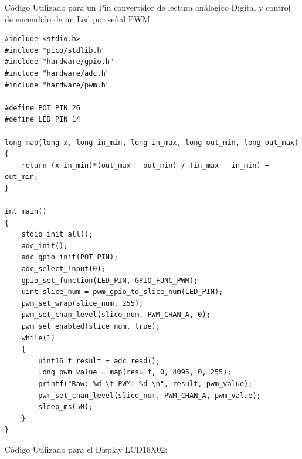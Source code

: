 \documentclass[12pt]{book} %
\begin{document}
Código Utilizado para un Pin convertidor de lectura análogico Digital y control de encendido de un Led por señal PWM.\\
\begin{lstlisting}
#include <stdio.h>
#include "pico/stdlib.h"
#include "hardware/gpio.h"
#include "hardware/adc.h"
#include "hardware/pwm.h"

#define POT_PIN 26
#define LED_PIN 14

long map(long x, long in_min, long in_max, long out_min, long out_max)
{
	return (x-in_min)*(out_max - out_min) / (in_max - in_min) + out_min;
}

int main()
{
	stdio_init_all();
	adc_init();
	adc_gpio_init(POT_PIN);
	adc_select_input(0);
	gpio_set_function(LED_PIN, GPIO_FUNC_PWM);
	uint slice_num = pwm_gpio_to_slice_num(LED_PIN);
	pwm_set_wrap(slice_num, 255);
	pwm_set_chan_level(slice_num, PWM_CHAN_A, 0);
	pwm_set_enabled(slice_num, true);
	while(1)
	{
		uint16_t result = adc_read();
		long pwm_value = map(result, 0, 4095, 0, 255);
		printf("Raw: %d \t PWM: %d \n", result, pwm_value);
		pwm_set_chan_level(slice_num, PWM_CHAN_A, pwm_value);
		sleep_ms(50);
	}
}

\end{lstlisting}
Código Utilizado para el Display LCD16X02: \\
\end{document}
